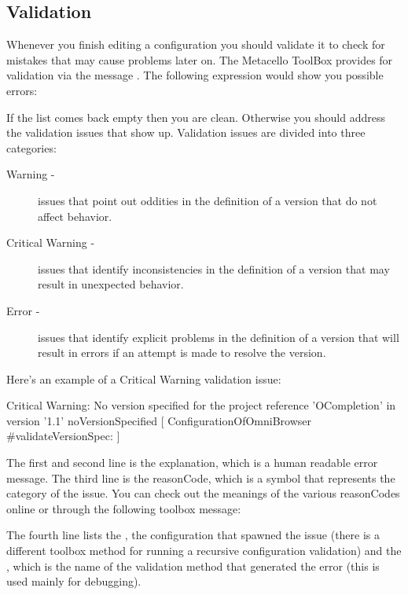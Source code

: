 \documentclass[a4paper,10pt,twoside]{book}
\begin{document}
\begin{code}{}
\begin{code}{}
\subsection{Validation}

Whenever you finish editing a configuration you should validate it to check for mistakes that may cause problems later on. The Metacello ToolBox provides for validation via the message . The following expression would show you possible errors: 

If the list comes back empty then you are clean. Otherwise you should address the validation issues that show up. Validation issues are divided into three categories:

\begin{description}
\item[Warning -] issues that point out oddities in the definition of a version that do not affect behavior.
\item[Critical Warning -] issues that identify inconsistencies in the definition of a version that may result in unexpected behavior.
\item[ Error -] issues that identify explicit problems in the definition of a version that will result in errors if an attempt is made to resolve the version.
\end{description}

Here's an example of a Critical Warning validation issue:
\begin{code}{}
Critical Warning: No version specified for the project reference 'OCompletion'
                in version '1.1'
     { noVersionSpecified }
     [ ConfigurationOfOmniBrowser #validateVersionSpec: ]
\end{code}     

The first and second line is the explanation, which is a human readable error message. The third line is the reasonCode, which is a symbol that represents the category of the issue. You can check out the meanings of the various reasonCodes online or through the following toolbox message:

The fourth line lists the , \ie the configuration that spawned the issue (there is a different toolbox method for running a recursive configuration validation) and the , which is the name of the validation method that generated the error (this is used mainly for debugging).




\end{code}
\end{code}
\end{document}
